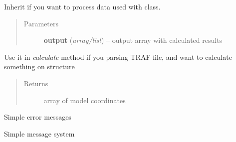 \documentclass[letterpaper,10pt,english]{sphinxmanual}
\begin{document}
\begin{fulllineitems}
\label{api:pycabs.Calculate}
Inherit if you want to process data used with {\hyperref[api:pycabs.Monitor]{}} class.
\begin{quote}\begin{description}
\item[{Parameters}] \leavevmode
\textbf{output} (\emph{array/list}) -- output array with calculated results

\end{description}\end{quote}

\begin{fulllineitems}
\label{api:pycabs.Calculate.processTrajectory}
Use it in \emph{calculate} method if you parsing TRAF file, and want to calculate something on structure
\begin{quote}\begin{description}
\item[{Returns}] \leavevmode
array of model coordinates

\end{description}\end{quote}

\end{fulllineitems}


\end{fulllineitems}


\begin{fulllineitems}
\label{api:pycabs.Errors}
Simple error messages

\end{fulllineitems}


\begin{fulllineitems}
\label{api:pycabs.Info}
Simple message system

\end{fulllineitems}

\end{document}
